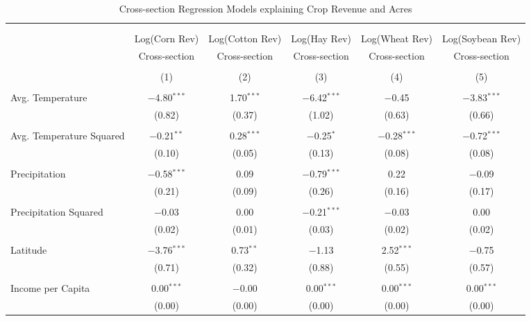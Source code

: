 \documentclass[10pt]{article}
\begin{document}
\begin{table}[!htbp] \centering 
  \caption{Cross-section Regression Models explaining Crop Revenue and Acres} 
  \label{} 
\footnotesize 
\begin{tabular}{@{\extracolsep{5pt}}lccccc} 
\\[-1.8ex]\hline 
\hline \\[-1.8ex] 
\\[-1.8ex] & Log(Corn Rev) & Log(Cotton Rev) & Log(Hay Rev) & Log(Wheat Rev) & Log(Soybean Rev) \\ 
 & Cross-section & Cross-section & Cross-section & Cross-section & Cross-section \\ 
\\[-1.8ex] & (1) & (2) & (3) & (4) & (5)\\ 
\hline \\[-1.8ex] 
 Avg. Temperature & $-$4.80$^{***}$ & 1.70$^{***}$ & $-$6.42$^{***}$ & $-$0.45 & $-$3.83$^{***}$ \\ 
  & (0.82) & (0.37) & (1.02) & (0.63) & (0.66) \\ 
  & & & & & \\ 
 Avg. Temperature Squared & $-$0.21$^{**}$ & 0.28$^{***}$ & $-$0.25$^{*}$ & $-$0.28$^{***}$ & $-$0.72$^{***}$ \\ 
  & (0.10) & (0.05) & (0.13) & (0.08) & (0.08) \\ 
  & & & & & \\ 
 Precipitation & $-$0.58$^{***}$ & 0.09 & $-$0.79$^{***}$ & 0.22 & $-$0.09 \\ 
  & (0.21) & (0.09) & (0.26) & (0.16) & (0.17) \\ 
  & & & & & \\ 
 Precipitation Squared & $-$0.03 & 0.00 & $-$0.21$^{***}$ & $-$0.03 & 0.00 \\ 
  & (0.02) & (0.01) & (0.03) & (0.02) & (0.02) \\ 
  & & & & & \\ 
 Latitude & $-$3.76$^{***}$ & 0.73$^{**}$ & $-$1.13 & 2.52$^{***}$ & $-$0.75 \\ 
  & (0.71) & (0.32) & (0.88) & (0.55) & (0.57) \\ 
  & & & & & \\ 
 Income per Capita & 0.00$^{***}$ & $-$0.00 & 0.00$^{***}$ & 0.00$^{***}$ & 0.00$^{***}$ \\ 
  & (0.00) & (0.00) & (0.00) & (0.00) & (0.00) \\ 

\end{tabular}
\end{table}
\end{document}
